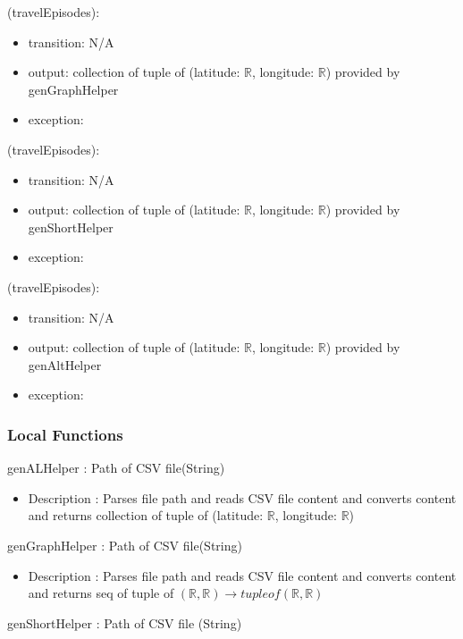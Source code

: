 \documentclass[12pt, titlepage]{article}
\begin{document}
\noindent {}(travelEpisodes):
\begin{itemize}
\item transition: N/A
\item output: collection of tuple of (latitude: $\mathbb{R}$, longitude: $\mathbb{R}$) provided by genGraphHelper
\item exception:  
\end{itemize}

\noindent {}(travelEpisodes):
\begin{itemize}
\item transition: N/A
\item output: collection of tuple of (latitude: $\mathbb{R}$, longitude: $\mathbb{R}$) provided by genShortHelper
\item exception:  
\end{itemize}

\noindent {}(travelEpisodes):
\begin{itemize}
\item transition: N/A
\item output: collection of tuple of (latitude: $\mathbb{R}$, longitude: $\mathbb{R}$) provided by genAltHelper
\item exception:  
\end{itemize}


\subsubsection{Local Functions}

genALHelper : Path of CSV file(String)
\begin{itemize}
    \item Description : Parses file path and reads CSV file content and converts content and returns collection of tuple of (latitude: $\mathbb{R}$, longitude: $\mathbb{R}$)
\end{itemize}

genGraphHelper : Path of CSV file(String)
\begin{itemize}
    \item Description : Parses file path and reads CSV file content and converts content and returns seq of tuple of $(\mathbb{R}, \mathbb{R})  \rightarrow tuple of (\mathbb{R}, \mathbb{R})$
\end{itemize}

genShortHelper : Path of CSV file (String)
\end{document}
